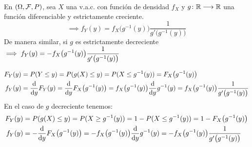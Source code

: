 \begin{teo}
	En $(\Omega, \mathcal{F}, P)$, sea $X$ una v.a.c. con función de densidad $f_X$ y $g \colon \mathbb{R} \longrightarrow \mathbb{R}$ una función diferenciable y estrictamente creciente.
	\[\implies f_Y(y)=f_X\big(g^{-1}(y)\big) \frac{1}{g'\big(g^{-1}(y)\big)}\]
	De manera similar, si $g$ es estrictamente decreciente$\displaystyle\implies f_Y(y)= - f_X\big(g^{-1}(y)\big) \frac{1}{g'\big(g^{-1}(y)\big)}$
	\begin{dem}
		\[\begin{aligned}
				F_Y(y) & = P(Y\leq y) = P(g(X)\leq y) = P(X\leq g^{-1}(y)) = F_X\big(g^{-1}(y)\big)                                                                                  \\
				f_Y(y) & = \odv{}{y} F_Y(y) = \odv{}{y} F_X\big(g^{-1}(y)\big) = f_X\big(g^{-1}(y)\big) \odv{}{y} g^{-1}(y) = f_X\big(g^{-1}(y)\big) \frac{1}{g'\big(g^{-1}(y)\big)}
			\end{aligned}\]
		En el caso de $g$ decreciente tenemos:
		\[\begin{aligned}
				F_Y(y) & = P(g(X)\leq y) = P(X\geq g^{-1}(y)) = 1 - P(X\leq g^{-1}(y)) = 1 - F_X\big(g^{-1}(y)\big) \\
				f_Y(y) & = -\odv{}{y} F_X\big(g^{-1}(y)\big) = -f_X\big(g^{-1}(y)\big) \odv{}{y} g^{-1}(y) = -f_X\big(g^{-1}(y)\big) \frac{1}{g'\big(g^{-1}(y)\big)}
			\end{aligned}\]
	\end{dem}
\end{teo}
